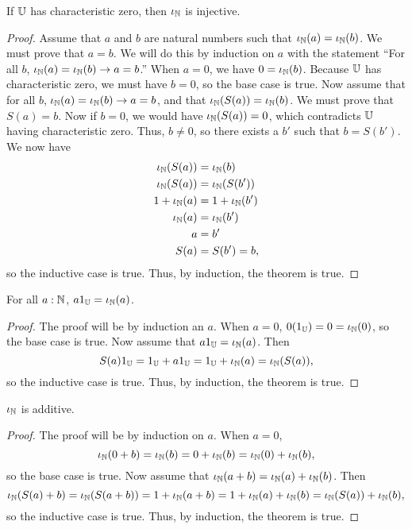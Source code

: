 \documentclass[../math.tex]{subfiles}
\begin{document}
\begin{instance}
    If $\mathbb{U}$ has characteristic zero, then $\iota_{\mathbb{N}}$ is injective.
\end{instance}
\begin{proof}
    Assume that $a$ and $b$ are natural numbers such that $\iota_{\mathbb{N}}(a) =
    \iota_{\mathbb{N}}(b)$.  We must prove that $a = b$.  We will do this by induction on
    $a$ with the statement ``For all $b$, $\iota_{\mathbb{N}}(a) = \iota_{\mathbb{N}}(b) \rightarrow
    a = b$.''  When $a = 0$, we have $0 = \iota_{\mathbb{N}}(b)$.  Because $\mathbb{U}$ has
    characteristic zero, we must have $b = 0$, so the base case is true.  Now
    assume that for all $b$, $\iota_{\mathbb{N}}(a) = \iota_{\mathbb{N}}(b) \rightarrow a = b$, and
    that $\iota_{\mathbb{N}}(S(a)) = \iota_{\mathbb{N}}(b)$.  We must prove that $S(a) = b$.  Now if
    $b = 0$, we would have $\iota_{\mathbb{N}}(S(a)) = 0$, which contradicts $\mathbb{U}$ having
    characteristic zero.  Thus, $b \neq 0$, so there exists a $b'$ such that $b
    = S(b')$.  We now have
    \begin{align*}
        \iota_{\mathbb{N}}(S(a)) &= \iota_{\mathbb{N}}(b) \\
        \iota_{\mathbb{N}}(S(a)) &= \iota_{\mathbb{N}}(S(b')) \\
        1 + \iota_{\mathbb{N}}(a) &= 1 + \iota_{\mathbb{N}}(b') \\
        \iota_{\mathbb{N}}(a) &= \iota_{\mathbb{N}}(b') \\
        a &= b' \\
        S(a) &= S(b') = b,
    \end{align*}
    so the inductive case is true.  Thus, by induction, the theorem is true.
\end{proof}

\begin{theorem}
    For all $a : \mathbb{N}$, $a1_{\mathbb{U}} = \iota_{\mathbb{N}}(a)$.
\end{theorem}
\begin{proof}
    The proof will be by induction an $a$.  When $a = 0$, $0(1_{\mathbb{U}}) = 0 =
    \iota_{\mathbb{N}}(0)$, so the base case is true.  Now assume that $a1_{\mathbb{U}} = \iota_{\mathbb{N}}(a)$.  Then
    \[
        S(a)1_{\mathbb{U}} = 1_{\mathbb{U}} + a1_{\mathbb{U}} = 1_{\mathbb{U}} + \iota_{\mathbb{N}}(a) = \iota_{\mathbb{N}}(S(a)),
    \]
    so the inductive case is true.  Thus, by induction, the theorem is true.
\end{proof}

\begin{instance}
    $\iota_{\mathbb{N}}$ is additive.
\end{instance}
\begin{proof}
    The proof will be by induction on $a$.  When $a = 0$,
    \[
        \iota_{\mathbb{N}}(0 + b) = \iota_{\mathbb{N}}(b) = 0 + \iota_{\mathbb{N}}(b) = \iota_{\mathbb{N}}(0) + \iota_{\mathbb{N}}(b),
    \]
    so the base case is true.  Now assume that $\iota_{\mathbb{N}}(a + b) = \iota_{\mathbb{N}}(a) + \iota_{\mathbb{N}}(b)$.
    Then
    \[
        \iota_{\mathbb{N}}(S(a) + b) = \iota_{\mathbb{N}}(S(a + b)) = 1 + \iota_{\mathbb{N}}(a + b) = 1 + \iota_{\mathbb{N}}(a) + \iota_{\mathbb{N}}(b) =
        \iota_{\mathbb{N}}(S(a)) + \iota_{\mathbb{N}}(b),
    \]
    so the inductive case is true.  Thus, by induction, the theorem is true.
\end{proof}
\end{document}
